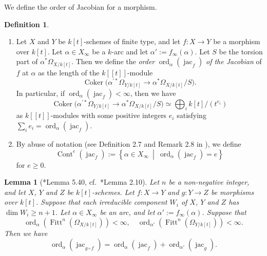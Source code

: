 \documentclass[a4paper,11pt]{amsart}
\newtheorem{lem}[thm]{Lemma}
\theoremstyle{definition}
\newtheorem{defi}[thm]{Definition}
\theoremstyle{remark}
\begin{document}
We define the order of Jacobian for a morphism. 

\begin{defi}\label{defi:jac_k[[t]]}
\begin{enumerate}
\item
Let $X$ and $Y$ be $k[t]$-schemes of finite type, and let $f:X \to Y$ be a morphism over $k[t]$. 
Let $\alpha \in X _{\infty}$ be a $k$-arc and let $\alpha ' := f_{\infty} (\alpha)$. 
Let $S$ be the torsion part of $\alpha ^* \Omega _{X / k[t]}$. 
Then we define the \textit{order} $\operatorname{ord}_{\alpha} (\operatorname{jac}_f)$ 
\textit{of the Jacobian} of $f$ at $\alpha$ as the length of the $k[[t]]$-module
\[
\operatorname{Coker} \bigl( \alpha ^{\prime *} \Omega _{Y / k[t]} \to \alpha ^* \Omega _{X / k[t]} /S \bigr).
\]
In particular, if $\operatorname{ord}_{\alpha} (\operatorname{jac}_f) < \infty$, then we have
\[
\operatorname{Coker} \bigl( \alpha ^{\prime *} \Omega _{Y / k[t]} \to \alpha ^* \Omega _{X / k[t]} /S \bigr) 
\simeq 
\bigoplus _i k[t]/(t^{e_i})
\]
as $k[[t]]$-modules with some positive integers $e_i$ satisfying $\sum_i e_i = \operatorname{ord}_{\alpha} (\operatorname{jac}_f)$. 



\item By abuse of notation (see Definition 2.7 and Remark 2.8 in \cite{NS22}), we define 
\[
\operatorname{Cont}^e \left( \operatorname{jac}_f \right) := 
\left \{ \alpha \in X_{\infty} \ \middle | \ \operatorname{ord}_{\alpha} \left( \operatorname{jac}_f \right) = e \right\}
\]
for $e \ge 0$. 
\end{enumerate}
\end{defi}

\begin{lem}[{\cite{NS2}*{Lemma 5.40}, cf.\ \cite{NS22}*{Lemma 2.10}}]\label{lem:additive}
Let $n$ be a non-negative integer, and let $X$, $Y$ and $Z$ be $k[t]$-schemes.
Let $f : X \to Y$ and $g: Y \to Z$ be morphisms over $k[t]$. 
Suppose that each irreducible component $W_i$ of $X$, $Y$ and $Z$ has $\dim W_i \ge n + 1$. 
Let $\alpha \in X_{\infty}$ be an arc, and let $\alpha ' := f_{\infty}(\alpha)$. 
Suppose that 
\[
\operatorname{ord}_{\alpha} \left( \operatorname{Fitt}^n \left( \Omega _{X/k[t]} \right) \right) < \infty, \quad 
\operatorname{ord}_{\alpha '} \left( \operatorname{Fitt}^n \left( \Omega _{Y/k[t]} \right) \right) < \infty. 
\]
Then we have 
\[
\operatorname{ord}_{\alpha} \left( \operatorname{jac}_{g \circ f} \right) = 
\operatorname{ord}_{\alpha} \left( \operatorname{jac}_{f} \right) + 
\operatorname{ord}_{\alpha '} \left( \operatorname{jac}_{g} \right). 
\]
\end{lem}
\end{document}
